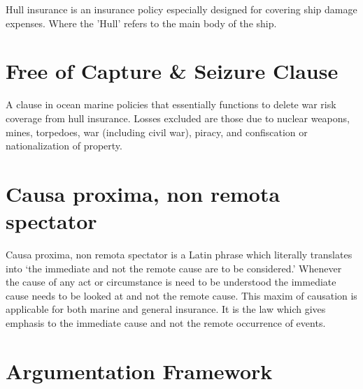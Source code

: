 Hull insurance is an insurance policy especially designed for covering ship damage expenses. Where the 'Hull' refers to the main body of the ship.

\section{Free of Capture \& Seizure Clause}

A clause in ocean marine policies that essentially functions to delete war risk coverage from hull insurance. Losses excluded are those due to nuclear weapons, mines, torpedoes, war (including civil war), piracy, and confiscation or nationalization of property.

\section{Causa proxima, non remota spectator}

Causa proxima, non remota spectator is a Latin phrase which literally translates into ‘the immediate and not the remote cause are to be considered.’ Whenever the cause of any act or circumstance is need to be understood the immediate cause needs to be looked at and not the remote cause. This maxim of causation is applicable for both marine and general insurance. It is the law which gives emphasis to the immediate cause and not the remote occurrence of events.

\section{Argumentation Framework}



\FloatBarrier

